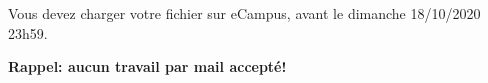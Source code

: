\documentclass[a4paper,11pt]{article}
\begin{document}
\sloppy
{}


Vous devez charger votre fichier sur eCampus, avant le dimanche 18/10/2020 23h59.


\begin{center}
\textbf{Rappel: aucun travail par mail accepté!}
\end{center}
\end{document}
